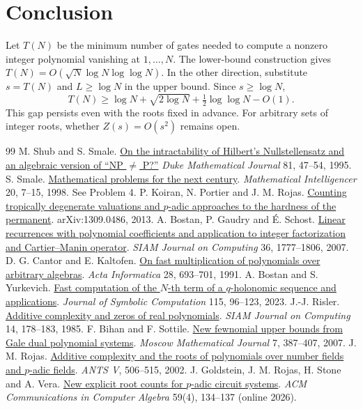 \documentclass[11pt,letterpaper]{article}
\begin{document}
\section{Conclusion}
Let \(T(N)\) be the minimum number of gates needed to compute a nonzero
integer polynomial vanishing at \(1,\ldots,N\). The lower-bound construction gives
\(T(N)=O(\sqrt N\log N\log\log N)\). In the other direction, substitute
\(s=T(N)\) and \(L\ge\log N\) in the upper bound. Since \(s\ge\log N\),
\[
 T(N)\ge \log N+\sqrt{2\log N}+\tfrac12\log\log N-O(1).
\]
This gap persists even with the roots fixed in advance. For arbitrary
sets of integer roots, whether \(Z(s)=O(s^2)\) remains open.

\clearpage
\begin{thebibliography}{99}\small
{} M. Shub and S. Smale.
\href{https://janos.cs.technion.ac.il/COURSES/238900-13/Papers-1/ShubSmale-pap97.pdf}{On the intractability of Hilbert's Nullstellensatz and an algebraic version of ``NP \(\ne\) P?''}
\emph{Duke Mathematical Journal} 81, 47--54, 1995.
 S. Smale.
\href{https://www.fim.uni-passau.de/fileadmin/dokumente/fakultaeten/fim/lehrstuhl/muller/SmaleProblems1998.pdf}{Mathematical problems for the next century}.
\emph{Mathematical Intelligencer} 20, 7--15, 1998. See Problem 4.
 P. Koiran, N. Portier and J. M. Rojas.
\href{https://arxiv.org/abs/1309.0486}{Counting tropically degenerate valuations and \(p\)-adic approaches to the hardness of the permanent}.
arXiv:1309.0486, 2013.
 A. Bostan, P. Gaudry and É. Schost.
\href{https://specfun.inria.fr/bostan/publications/BoGaSc07.pdf}{Linear recurrences with polynomial coefficients and application to integer factorization and Cartier--Manin operator}.
\emph{SIAM Journal on Computing} 36, 1777--1806, 2007.
 D. G. Cantor and E. Kaltofen.
\href{https://users.cs.duke.edu/~elk27/bibliography/91/CaKa91.pdf}{On fast multiplication of polynomials over arbitrary algebras}.
\emph{Acta Informatica} 28, 693--701, 1991.
 A. Bostan and S. Yurkevich.
\href{https://arxiv.org/abs/2012.08656}{Fast computation of the \(N\)-th term of a \(q\)-holonomic sequence and applications}.
\emph{Journal of Symbolic Computation} 115, 96--123, 2023.
 J.-J. Risler.
\href{https://doi.org/10.1137/0214014}{Additive complexity and zeros of real polynomials}.
\emph{SIAM Journal on Computing} 14, 178--183, 1985.
 F. Bihan and F. Sottile.
\href{https://arxiv.org/abs/math/0609544}{New fewnomial upper bounds from Gale dual polynomial systems}.
\emph{Moscow Mathematical Journal} 7, 387--407, 2007.
 J. M. Rojas.
\href{https://arxiv.org/abs/math/0201154}{Additive complexity and the roots of polynomials over number fields and \(p\)-adic fields}.
\emph{ANTS V}, 506--515, 2002.
 J. Goldstein, J. M. Rojas, H. Stone and A. Vera.
\href{https://doi.org/10.1145/3832046.3832061}{New explicit root counts for \(p\)-adic circuit systems}.
\emph{ACM Communications in Computer Algebra} 59(4), 134--137 (online 2026).
\end{thebibliography}
\end{document}
